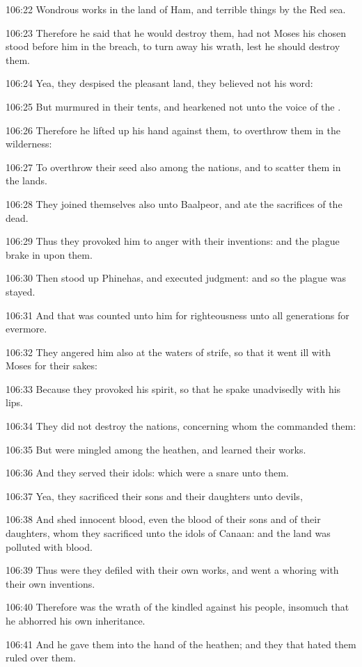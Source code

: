 106:22 Wondrous works in the land of Ham, and terrible things by the
Red sea.

106:23 Therefore he said that he would destroy them, had not Moses his
chosen stood before him in the breach, to turn away his wrath, lest he
should destroy them.

106:24 Yea, they despised the pleasant land, they believed not his
word:

106:25 But murmured in their tents, and hearkened not unto the voice
of the \LORD.

106:26 Therefore he lifted up his hand against them, to overthrow them
in the wilderness:

106:27 To overthrow their seed also among the nations, and to scatter
them in the lands.

106:28 They joined themselves also unto Baalpeor, and ate the
sacrifices of the dead.

106:29 Thus they provoked him to anger with their inventions: and the
plague brake in upon them.

106:30 Then stood up Phinehas, and executed judgment: and so the
plague was stayed.

106:31 And that was counted unto him for righteousness unto all
generations for evermore.

106:32 They angered him also at the waters of strife, so that it went
ill with Moses for their sakes:

106:33 Because they provoked his spirit, so that he spake unadvisedly
with his lips.

106:34 They did not destroy the nations, concerning whom the \LORD
commanded them:

106:35 But were mingled among the heathen, and learned their works.

106:36 And they served their idols: which were a snare unto them.

106:37 Yea, they sacrificed their sons and their daughters unto
devils,

106:38 And shed innocent blood, even the blood of their sons and of
their daughters, whom they sacrificed unto the idols of Canaan: and
the land was polluted with blood.

106:39 Thus were they defiled with their own works, and went a whoring
with their own inventions.

106:40 Therefore was the wrath of the \LORD kindled against his people,
insomuch that he abhorred his own inheritance.

106:41 And he gave them into the hand of the heathen; and they that
hated them ruled over them.

